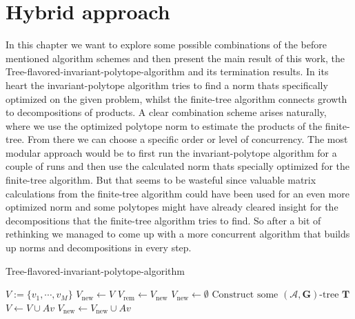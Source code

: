 
\chapter{Hybrid approach} 
\label{ch:hybrid}

In this chapter we want to explore some possible combinations of the before mentioned algorithm schemes and then present the main result of this work, the Tree-flavored-invariant-polytope-algorithm and its termination results. 
\newline
In its heart the invariant-polytope algorithm tries to find a norm thats specifically optimized on the given problem, whilst the finite-tree algorithm connects growth to decompositions of products. A clear combination scheme arises naturally, where we use the optimized polytope norm to estimate the products of the finite-tree. From there we can choose a specific order or level of concurrency.
\newline
The most modular approach would be to first run the invariant-polytope algorithm for a couple of runs and then use the calculated norm thats specially optimized for the finite-tree algorithm. But that seems to be wasteful since valuable matrix calculations from the finite-tree algorithm could have been used for an even more optimized norm and some polytopes might have already cleared insight for the decompositions that the finite-tree algorithm tries to find. So after a bit of rethinking we managed to come up with a more concurrent algorithm that builds up norms and decompositions in every step. 


\begin{algorithm}[h]
    \caption{Tree-flavored-invariant-polytope-algorithm}
    \label{alg:hybrid}
    \begin{algorithmic}
        \State $V := \{v_1, \cdots, v_M\}$
        \State $V_{\text{new}} \gets V$
            \State $V_{\text{rem}} \gets V_{\text{new}}$
            \State $V_{\text{new}} \gets \emptyset$
                \State $\text{Construct some } (\mathcal{A},\mathbf{G})\text{-tree } \mathbf{T}$
                        \State $V \gets V \cup Av$
                        \State $V_{\text{new}} \gets V_{\text{new}} \cup Av$
                    \EndIf
                \EndFor
            \EndFor
        \EndWhile \\
        \Return \\
    \end{algorithmic}
\end{algorithm}

